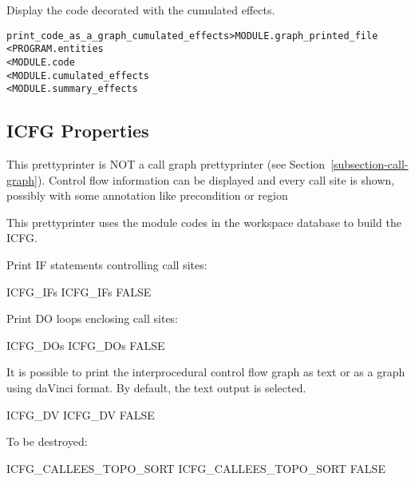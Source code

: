 \documentclass[a4paper]{report}
\newenvironment{PipsMake}{\begin{alltt}}{\end{alltt}}
\newenvironment{PipsPass}[1]{\label{pass:#1}}{}
\begin{document}
\begin{PipsPass}{print_code_as_a_graph_cumulated_effects}
Display the code decorated with the cumulated effects.
\end{PipsPass}

\begin{PipsMake}
print_code_as_a_graph_cumulated_effects    > MODULE.graph_printed_file
        < PROGRAM.entities
        < MODULE.code
        < MODULE.cumulated_effects
        < MODULE.summary_effects
\end{PipsMake}

\subsection{ICFG Properties}

\label{subsection-interprocedural-control-flow-graph}

This prettyprinter is NOT a call graph prettyprinter (see
Section~\ref{subsection-call-graph}). Control flow information can be
displayed and every call site is shown, possibly with some annotation like
precondition or region

This prettyprinter uses the module codes in the workspace database to
build the ICFG.

Print IF statements controlling call sites:

\begin{PipsProp}{ICFG_IFs}
ICFG_IFs FALSE
\end{PipsProp}

Print DO loops enclosing call sites:

\begin{PipsProp}{ICFG_DOs}
ICFG_DOs FALSE
\end{PipsProp}

It is possible to print the interprocedural control flow graph as text or
as a graph using daVinci format. By default, the text output is selected.

\begin{PipsProp}{ICFG_DV}
ICFG_DV FALSE
\end{PipsProp}

To be destroyed:

\begin{PipsProp}{ICFG_CALLEES_TOPO_SORT}
ICFG_CALLEES_TOPO_SORT FALSE
\end{PipsProp}
\end{document}
